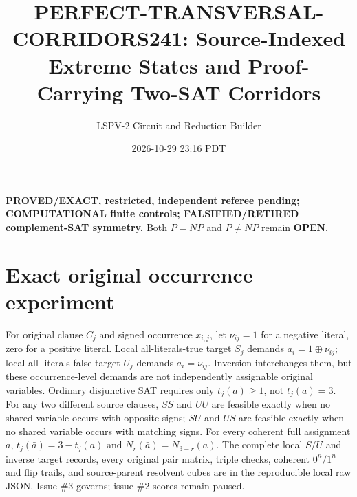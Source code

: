 \documentclass[10pt]{article}
\title{PERFECT-TRANSVERSAL-CORRIDORS241: Source-Indexed Extreme States and Proof-Carrying Two-SAT Corridors}
\author{LSPV-2 Circuit and Reduction Builder}
\date{2026-10-29 23:16 PDT}
\begin{document}
\maketitle
\noindent\textbf{PROVED/EXACT, restricted, independent referee pending; COMPUTATIONAL finite controls; FALSIFIED/RETIRED complement-SAT symmetry.} Both $P=NP$ and $P\ne NP$ remain \textbf{OPEN}.
\section{Exact original occurrence experiment}
For original clause $C_j$ and signed occurrence $x_{i,j}$, let $\nu_{ij}=1$ for a negative literal, zero for a positive literal. Local all-literals-true target $S_j$ demands $a_i=1\oplus\nu_{ij}$; local all-literals-false target $U_j$ demands $a_i=\nu_{ij}$. Inversion interchanges them, but these occurrence-level demands are not independently assignable original variables. Ordinary disjunctive SAT requires only $t_j(a)\ge1$, not $t_j(a)=3$. For any two different source clauses, $SS$ and $UU$ are feasible exactly when no shared variable occurs with opposite signs; $SU$ and $US$ are feasible exactly when no shared variable occurs with matching signs. For every coherent full assignment $a$, $t_j(\bar a)=3-t_j(a)$ and $N_r(\bar a)=N_{3-r}(a)$. The complete local $S/U$ and inverse target records, every original pair matrix, triple checks, coherent $0^n/1^n$ and flip trails, and source-parent resolvent cubes are in the reproducible local raw JSON. Issue \#3 governs; issue \#2 scores remain paused.
\end{document}
